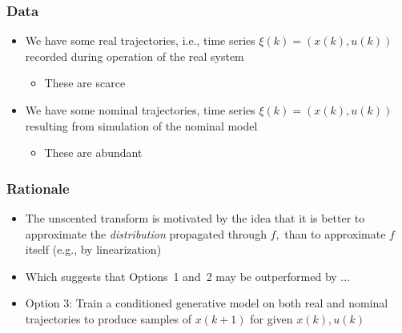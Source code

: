 \documentclass[aspectratio=169,handout]{beamer} 	%
\begin{document}
\begin{frame}
	\frametitle{Data}
	\begin{itemize}[<+->]
		\itemsep \baselineskip
		
		\item We have some \alert{real trajectories}, i.e., time series 
		$\xi(k) = (x(k), u(k))$ recorded during operation of the real system
		\begin{itemize}
			\item These are scarce
		\end{itemize}
		
		\item We have some \alert{nominal trajectories}, time series 
		$\xi(k) = (x(k), u(k))$ resulting from simulation of the nominal model
		\begin{itemize}
			\item These are abundant
		\end{itemize}
		
	\end{itemize}
	
\end{frame}





\begin{frame}
	\frametitle{Rationale}
	\begin{itemize}[<+->]
		\itemsep \baselineskip
		
		\item The unscented transform is motivated by the idea that it is better to
		approximate the \emph{distribution} propagated through $f,$ than to approximate
		$f$ itself (e.g., by linearization)
		
		\item Which suggests that Options~1 and~2 may be outperformed by ...
		
		\item \alert{Option 3:} Train a conditioned generative model on both
		real and nominal trajectories to produce samples of 
		$x(k + 1)$ for given $x(k), u(k)$
	
		
	\end{itemize}
	
\end{frame}
\end{document}
